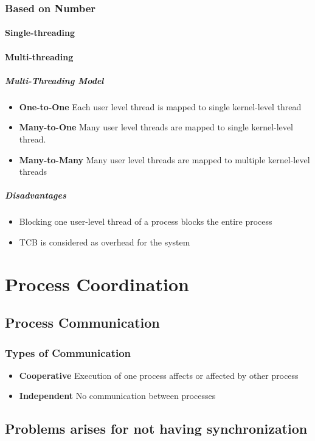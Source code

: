 \subsubsection{Based on Number}
\paragraph{Single-threading}
\paragraph{Multi-threading}
\subparagraph{Multi-Threading Model}
\begin{itemize}
	\item \textbf{One-to-One} Each user level thread is mapped to single kernel-level thread
	\item \textbf{Many-to-One} Many user level threads are mapped to single kernel-level thread.
	\item \textbf{Many-to-Many} Many user level threads are mapped to multiple kernel-level threads
\end{itemize}
\subparagraph{Disadvantages}
\begin{itemize}
	\item Blocking one user-level thread of a process blocks the entire process
	\item TCB is considered as overhead for the system
\end{itemize}
\section{Process Coordination}
\subsection{Process Communication}
\subsubsection{Types of Communication}
\begin{itemize}
	\item \textbf{Cooperative} Execution of one process affects or affected by other process
	\item \textbf{Independent} No communication between processes
\end{itemize}
\subsection{Problems arises for not having synchronization}
